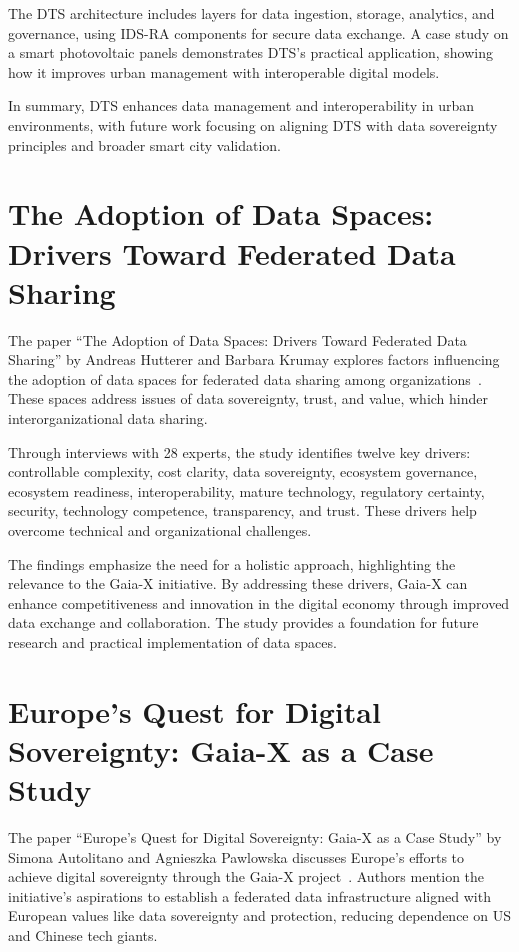 The DTS architecture includes layers for data ingestion, storage, analytics, and governance, using IDS-RA components for secure data exchange.
A case study on a smart photovoltaic panels demonstrates DTS's practical application, showing how it improves urban management with interoperable digital models.

In summary, DTS enhances data management and interoperability in urban environments, with future work focusing on aligning DTS with data sovereignty principles and broader smart city validation.

\section{The Adoption of Data Spaces: Drivers Toward Federated Data Sharing}\label{sec:the-adoption-of-data-spaces:-drivers-toward-federated-data-sharing}

The paper ``The Adoption of Data Spaces: Drivers Toward Federated Data Sharing'' by Andreas Hutterer and Barbara Krumay explores factors influencing the adoption of data spaces for federated data sharing among organizations~\cite{adoption_of_data_spaces}.
These spaces address issues of data sovereignty, trust, and value, which hinder interorganizational data sharing.

Through interviews with 28 experts, the study identifies twelve key drivers: controllable complexity, cost clarity, data sovereignty, ecosystem governance, ecosystem readiness, interoperability, mature technology, regulatory certainty, security, technology competence, transparency, and trust.
These drivers help overcome technical and organizational challenges.

The findings emphasize the need for a holistic approach, highlighting the relevance to the Gaia-X initiative.
By addressing these drivers, Gaia-X can enhance competitiveness and innovation in the digital economy through improved data exchange and collaboration.
The study provides a foundation for future research and practical implementation of data spaces.

\section{Europe's Quest for Digital Sovereignty: Gaia-X as a Case Study}\label{sec:europes-quest-for-digital-sovereignty:-gaia-x-as-a-case-study}

The paper ``Europe’s Quest for Digital Sovereignty: Gaia-X as a Case Study'' by Simona Autolitano and Agnieszka Pawlowska discusses Europe's efforts to achieve digital sovereignty through the Gaia-X project~\cite{europe_quest_for_digital_sovereignty}.
Authors mention the initiative's aspirations to establish a federated data infrastructure aligned with European values like data sovereignty and protection, reducing dependence on US and Chinese tech giants.

